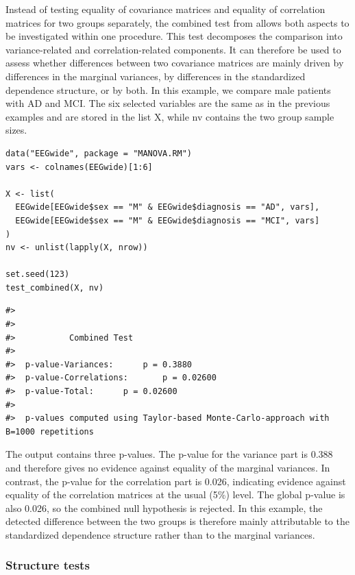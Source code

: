 Instead of testing equality of covariance matrices and equality of correlation
matrices for two groups separately, the combined test from \citet{sattler2023} allows both
aspects to be investigated within one procedure. This test
decomposes the comparison into variance-related and correlation-related components. It can therefore be used to assess whether
differences between two covariance matrices are mainly driven by differences in
the marginal variances, by differences in the standardized dependence structure,
or by both.
In this example, we compare male patients with AD and MCI. The six selected
variables are the same as in the previous examples and are stored in the list
X, while nv contains the two group sample sizes.

\begin{verbatim}
data("EEGwide", package = "MANOVA.RM")
vars <- colnames(EEGwide)[1:6]

X <- list(
  EEGwide[EEGwide$sex == "M" & EEGwide$diagnosis == "AD", vars],
  EEGwide[EEGwide$sex == "M" & EEGwide$diagnosis == "MCI", vars]
)
nv <- unlist(lapply(X, nrow))

set.seed(123)
test_combined(X, nv)
\end{verbatim}

\begin{verbatim}
#> 
#> 
#>           Combined Test 
#> 
#>  p-value-Variances:      p = 0.3880
#>  p-value-Correlations:       p = 0.02600
#>  p-value-Total:      p = 0.02600
#>  
#>  p-values computed using Taylor-based Monte-Carlo-approach with B=1000 repetitions
\end{verbatim}

The output contains three p-values. The p-value for the variance part is
0.388 and therefore gives no evidence against equality of the marginal
variances. In contrast, the p-value for the correlation part is 0.026, indicating
evidence against equality of the correlation matrices at the usual (5\%)
level. The global p-value is also 0.026, so the combined null hypothesis is
rejected. In this example, the detected difference between the two groups is
therefore mainly attributable to the standardized dependence structure rather
than to the marginal variances.

\subsubsection{Structure tests}\label{structure-tests}

